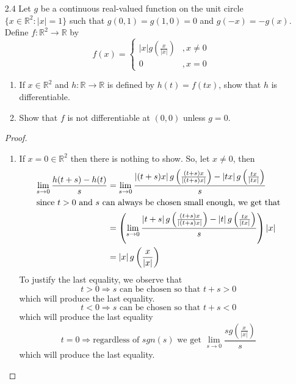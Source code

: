 \begin{enumerate}
    \item[2.4] Let \( g \) be a continuous real-valued function on the unit circle \( \{ x\in\mathbb{R}^2: \left| x \right| = 1 \} \) such that \( g(0,1) = g(1,0)=0 \) and \( g(-x) = -g(x) \). Define \( f: \mathbb{R}^2 \rightarrow \mathbb{R} \) by
    \[
    f(x) = \begin{cases} \left|x \right| g\left( \frac{x}{\left|x\right|} \right) & ,x \neq 0 \\ 0 & , x =0 \end{cases}
    \]
    
    \begin{enumerate}
        \item If \( x \in \mathbb{R}^2 \) and \( h: \mathbb{R} \rightarrow \mathbb{R} \) is defined by \( h(t) = f(tx) \), show that \( h \) is differentiable.
        
        \item Show that \( f \) is not differentiable at \( (0,0) \) unless \( g=0 \). 
    \end{enumerate}
    
    \begin{proof}
    \begin{enumerate}
        \item If \( x = 0 \in \mathbb{R}^2 \) then there is nothing to show. So, let \( x \neq 0 \), then 
        \begin{align*}
            \lim_{s \rightarrow 0} \frac{h(t+s) - h(t)}{s} &= \lim_{s \rightarrow 0} \frac{\left|(t+s)x\right|g \left( \frac{(t+s)x}{\left| (t+s)x \right|} \right)- \left| tx \right| g\left( \frac{tx}{\left|tx\right|} \right)}{s} \\
            \intertext{since \( t > 0 \) and \( s \) can always be chosen small enough, we get that}
            &= \left( \lim_{s \rightarrow 0} \frac{\left|t+s\right|g\left( \frac{(t+s)x}{\left| (t+s)x \right|} \right)-\left| t \right| g\left( \frac{tx}{\left|tx\right|} \right)}{s}\right) \left|x\right| \\
            &= \left| x \right| g\left( \frac{x}{\left| x \right|} \right)
        \end{align*}
    To justify the last equality, we observe that
    \[
        t > 0 \Rightarrow s \text{ can be chosen so that } t+s > 0
    \]
    which will produce the last equality.
    \[
        t < 0 \Rightarrow s \text{ can be chosen so that } t+s < 0 
    \]
    which will produce the last equality
    \[
        t = 0 \Rightarrow \text{regardless of } sgn(s) \text{ we get } \lim_{s \rightarrow 0} \frac{s g\left( \frac{x}{\left|x\right|} \right)}{s}
    \]
    which will produce the last equality.
    

\end{enumerate}
\end{proof}
\end{enumerate}
